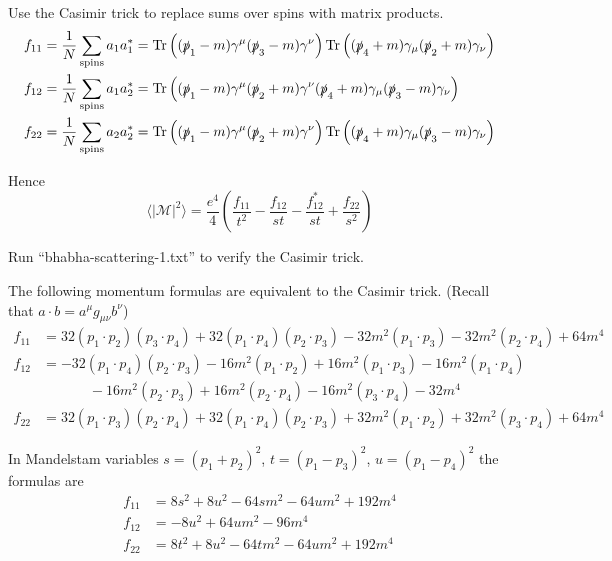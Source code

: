 \documentclass[12pt]{article}
\begin{document}
\noindent
Use the Casimir trick to replace sums over spins with matrix products.
\begin{align*}
f_{11}&=\frac{1}{N}\sum_\text{spins}a_1a_1^*=
\mathop{\rm Tr}\left(
(\slashed{p}_1-m)\gamma^\mu(\slashed{p}_3-m)\gamma^\nu
\right)
\mathop{\rm Tr}\left(
(\slashed{p}_4+m)\gamma_\mu(\slashed{p}_2+m)\gamma_\nu
\right)
\\
f_{12}&=\frac{1}{N}\sum_{\rm spins}a_1a_2^*=
\mathop{\rm Tr}\left(
(\slashed{p}_1-m)\gamma^\mu(\slashed{p}_2+m)\gamma^\nu
(\slashed{p}_4+m)\gamma_\mu(\slashed{p}_3-m)\gamma_\nu
\right)
\\
f_{22}&=\frac{1}{N}\sum_\text{spins}a_2a_2^*=
\mathop{\rm Tr}\left(
(\slashed{p}_1-m)\gamma^\mu(\slashed{p}_2+m)\gamma^\nu
\right)
\mathop{\rm Tr}\left(
(\slashed{p}_4+m)\gamma_\mu(\slashed{p}_3-m)\gamma_\nu
\right)
\end{align*}

\noindent
Hence
\begin{equation*}
\langle|\mathcal{M}|^2\rangle
=\frac{e^4}{4}
\left(
\frac{f_{11}}{t^2} - \frac{f_{12}}{st} -
\frac{f_{12}^*}{st} + \frac{f_{22}}{s^2}
\right)
\end{equation*}

\noindent
Run ``bhabha-scattering-1.txt'' to verify the Casimir trick.

\bigskip
\noindent
The following momentum formulas are equivalent to the Casimir trick.
(Recall that $a\cdot b=a^\mu g_{\mu\nu}b^\nu$)
\begin{align*}
f_{11}&=
32(p_1\cdot p_2)(p_3\cdot p_4)+32(p_1\cdot p_4)(p_2\cdot p_3)
-32 m^2(p_1\cdot p_3)-32 m^2(p_2\cdot p_4)+64 m^4
\\
f_{12}&=
-32 (p_1\cdot p_4) (p_2\cdot p_3)
-16 m^2 (p_1\cdot p_2) + 16 m^2 (p_1\cdot p_3) - 16 m^2 (p_1\cdot p_4)\\
&\phantom{=}\qquad
{}- 16 m^2 (p_2\cdot p_3) + 16 m^2 (p_2\cdot p_4) - 16 m^2 (p_3\cdot p_4) - 32 m^4
\\
f_{22}&=
32(p_1\cdot p_3)(p_2\cdot p_4)+32(p_1\cdot p_4)(p_2\cdot p_3)
+32 m^2(p_1\cdot p_2)+32 m^2(p_3\cdot p_4)+64 m^4
\end{align*}

\noindent
In Mandelstam variables $s=(p_1+p_2)^2$, $t=(p_1-p_3)^2$, $u=(p_1-p_4)^2$ the formulas are
\begin{align*}
f_{11} &= 8 s^2 + 8 u^2 - 64 s m^2 - 64 u m^2 + 192 m^4
\\
f_{12} &= -8 u^2 + 64 u m^2 - 96 m^4
\\
f_{22} &= 8 t^2 + 8 u^2 - 64 t m^2 - 64 u m^2 + 192 m^4
\end{align*}
\end{document}
